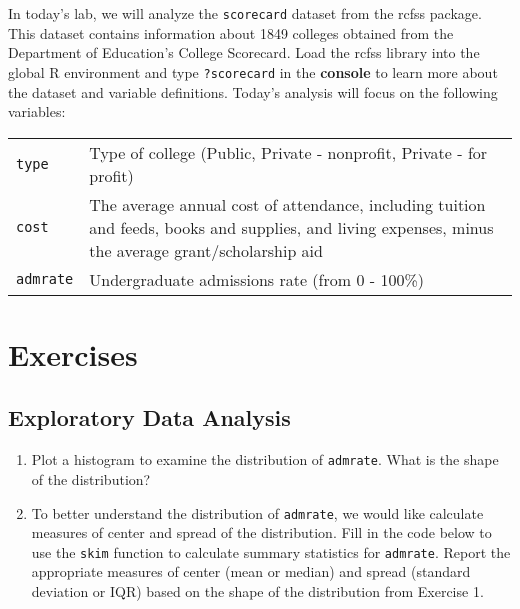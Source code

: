 \documentclass[]{book}
\begin{document}
In today's lab, we will analyze the \texttt{scorecard} dataset from the
rcfss package. This dataset contains information about 1849 colleges
obtained from the Department of Education's College Scorecard. Load the
rcfss library into the global R environment and type \texttt{?scorecard}
in the \textbf{console} to learn more about the dataset and variable
definitions. Today's analysis will focus on the following variables:

\begin{longtable}[]{@{}ll@{}}
\toprule
\begin{minipage}[t]{0.16\columnwidth}\raggedright\strut
\texttt{type}\strut
\end{minipage} & \begin{minipage}[t]{0.56\columnwidth}\raggedright\strut
Type of college (Public, Private - nonprofit, Private - for
profit)\strut
\end{minipage}\tabularnewline
\begin{minipage}[t]{0.16\columnwidth}\raggedright\strut
\texttt{cost}\strut
\end{minipage} & \begin{minipage}[t]{0.56\columnwidth}\raggedright\strut
The average annual cost of attendance, including tuition and feeds,
books and supplies, and living expenses, minus the average
grant/scholarship aid\strut
\end{minipage}\tabularnewline
\begin{minipage}[t]{0.16\columnwidth}\raggedright\strut
\texttt{admrate}\strut
\end{minipage} & \begin{minipage}[t]{0.56\columnwidth}\raggedright\strut
Undergraduate admissions rate (from 0 - 100\%)\strut
\end{minipage}\tabularnewline
\bottomrule
\end{longtable}

\section{Exercises}\label{exercises-1}

\subsection{Exploratory Data Analysis}\label{exploratory-data-analysis}

\begin{enumerate}
\def\labelenumi{\arabic{enumi}.}
\item
  Plot a histogram to examine the distribution of \texttt{admrate}. What
  is the shape of the distribution?
\item
  To better understand the distribution of \texttt{admrate}, we would
  like calculate measures of center and spread of the distribution. Fill
  in the code below to use the \texttt{skim} function to calculate
  summary statistics for \texttt{admrate}. Report the appropriate
  measures of center (mean or median) and spread (standard deviation or
  IQR) based on the shape of the distribution from Exercise 1.
\end{enumerate}
\end{document}
